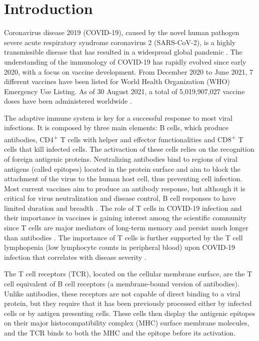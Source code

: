 \chapter*{Introduction}


Coronavirus disease 2019 (COVID-19), caused by the novel human pathogen severe acute respiratory syndrome coronavirus 2 (SARS-CoV-2), is a highly transmissible disease that has resulted in a widespread global pandemic \citep{hu}. The understanding of the immunology of COVID-19 has rapidly evolved since early 2020, with a focus on vaccine development. From December 2020 to June 2021, 7 different vaccines have been listed for World Health Organization (WHO) Emergency Use Listing. As of 30 August 2021, a total of 5,019,907,027 vaccine doses have been administered worldwide \citep{who}.

The adaptive immune system is key for a successful response to most viral infections. It is composed by three main elements: B cells, which produce antibodies, CD4\textsuperscript{+} T cells with helper and effector functionalities and CD8\textsuperscript{+} T cells that kill infected cells. The activaction of these cells relies on the recognition of foreign antigenic proteins. Neutralizing antibodies bind to regions of viral antigens (called epitopes) located in the protein surface and aim to block the attachment of the virus to the human host cell, thus preventing cell infection. Most current vaccines aim to produce an antibody response, but although it is critical for virus neutralization and disease control, B cell responses to \covid{} have limited duration and breadth \citep{vaccinetcell}. The role of T cells in COVID-19 infection and their importance in vaccines is gaining interest among the scientific community since T cells are major mediators of long-term memory and persist much longer than antibodies \citep{tcellsdiag}. The importance of T cells is further supported by the T cell lymphopenia (low lymphocyte counts in peripheral blood) upon COVID-19 infection that correlates with disease severity \citep{lymphopeniaseverity}.


The T cell receptors (TCR), located on the cellular membrane surface, are the T cell equivalent of B cell receptors (a membrane-bound version of antibodies). Unlike antibodies, these receptors are not capable of direct binding to a viral protein, but they require that it has been previously processed either by infected cells or by antigen presenting cells. These cells then display the antigenic epitopes on their major histocompatibility complex (MHC) surface membrane molecules, and the TCR binds to both the MHC and the epitope before its activation.

